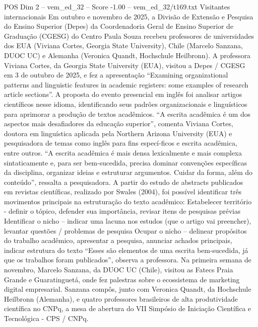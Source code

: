 \begin{textsample}{POS Dim 2 – vem\_ed\_32 – Score -1.00 – vem\_ed\_32/t169.txt}  \label{ex:f2_pos_040}
Visitantes internacionais Em outubro e novembro de 2025, a Divisão de Extensão e Pesquisa do Ensino Superior (Depes) da Coordenadoria Geral de Ensino Superior de Graduação (CGESG) do Centro Paula Souza recebeu professores de universidades dos EUA (Viviana Cortes, Georgia State University), Chile (Marcelo Sanzana, DUOC UC) e Alemanha (Veronica Quandt, Hochschule Heilbronn).
A professora Viviana Cortes, da Georgia State University (EUA), visitou a Depes / CGESG em 3 de outubro de 2025, e fez a apresentação “Examining organizational patterns and linguistic features in academic registers: some examples of research article sections”.
A proposta do evento presencial em inglês foi analisar artigos científicos nesse idioma, identificando seus padrões organizacionais e linguísticos para aprimorar a produção de textos acadêmicos. “A escrita acadêmica é um dos aspectos mais desafiadores da educação superior”, comenta Viviana Cortes, doutora em linguística aplicada pela Northern Arizona University (EUA) e pesquisadora de temas como inglês para fins especí-ficos e escrita acadêmica, entre outros. “A escrita acadêmica é mais densa lexicalmente e mais complexa sintaticamente e, para ser bem-sucedida, precisa dominar convenções específicas da disciplina, organizar ideias e estruturar argumentos.
Cuidar da forma, além do conteúdo”, ressalta a pesquisadora.
A partir do estudo de abstracts publicados em revistas científicas, realizado por Swales (2004), foi possível identificar três movimentos principais na estruturação do texto acadêmico: Estabelecer território - definir o tópico, defender sua importância, revisar itens de pesquisas prévias Identificar o nicho – indicar uma lacuna nos estudos (que o artigo vai preencher), levantar questões / problemas de pesquisa Ocupar o nicho – delinear propósitos do trabalho acadêmico, apresentar a pesquisa, anunciar achados principais, indicar estrutura do texto “Esses são elementos de uma escrita bem-sucedida, já que os trabalhos foram publicados”, observa a professora.
Na primeira semana de novembro, Marcelo Sanzana, da DUOC UC (Chile), visitou as Fatecs Praia Grande e Guaratinguetá, onde fez palestras sobre o ecossistema de marketing digital empresarial.
Sanzana compôs, junto com Veronica Quandt, da Hochschule Heilbronn (Alemanha), e quatro professores brasileiros de alta produtividade científica no CNPq, a mesa de abertura do VII Simpósio de Iniciação Científica e Tecnológica - CPS / CNPq.

\end{textsample}
